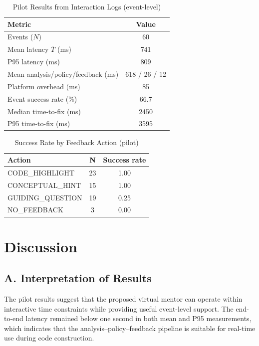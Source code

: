 \documentclass[conference]{IEEEtran}
\begin{document}
\begin{table}[t]
\centering
\caption{Pilot Results from Interaction Logs (event-level)}
\label{tab:results}
\renewcommand{\arraystretch}{1.15}
\begin{tabular}{lc}
\hline
\textbf{Metric} & \textbf{Value} \\
\hline
Events ($N$) & 60 \\
Mean latency $\bar{T}$ (ms) & 741 \\
P95 latency (ms) & 809 \\
Mean analysis/policy/feedback (ms) & 618 / 26 / 12 \\
Platform overhead (ms) & 85 \\
Event success rate (\%) & 66.7 \\
Median time-to-fix (ms) & 2450 \\
P95 time-to-fix (ms) & 3595 \\
\hline
\end{tabular}
\end{table}

\begin{table}[t]
\centering
\caption{Success Rate by Feedback Action (pilot)}
\label{tab:action_success}
\renewcommand{\arraystretch}{1.15}
\begin{tabular}{lcc}
\hline
\textbf{Action} & \textbf{N} & \textbf{Success rate} \\
\hline
CODE\_HIGHLIGHT & 23 & 1.00 \\
CONCEPTUAL\_HINT & 15 & 1.00 \\
GUIDING\_QUESTION & 19 & 0.25 \\
NO\_FEEDBACK & 3 & 0.00 \\
\hline
\end{tabular}
\end{table}

\section{Discussion}

\subsection*{A. Interpretation of Results}

The pilot results suggest that the proposed virtual mentor can operate within interactive time constraints while providing useful event-level support. The end-to-end latency remained below one second in both mean and P95 measurements, which indicates that the analysis--policy--feedback pipeline is suitable for real-time use during code construction.
\end{document}
